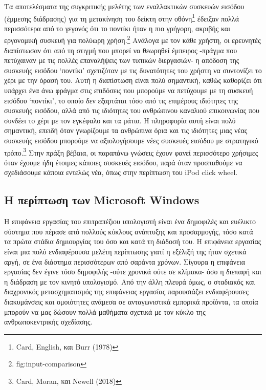 \documentclass[
]{article}
\begin{document}
Τα αποτελέσματα της συγκριτικής μελέτης των εναλλακτικών συσκευών
εισόδου (έμμεσης διάδρασης) για τη μετακίνηση του δείκτη στην
οθόνη\footnote{Card, English, και Burr (1978)} έδειξαν πολλά περισσότερα
από το γεγονός ότι το ποντίκι ήταν η πιο γρήγορη, ακριβής και εργονομική
συσκευή για πολύωρη χρήση.\footnote{fig:input-comparison} Ανάλογα με τον
κάθε χρήστη, οι ερευνητές διαπίστωσαν ότι από τη στιγμή που μπορεί να
θεωρηθεί έμπειρος -πράγμα που πετύχαιναν με τις πολλές επαναλήψεις των
τυπικών διεργασιών- η απόδοση της συσκευής εισόδου `ποντίκι' σχετιζόταν
με τις δυνατότητες του χρήστη να συντονίζει το χέρι με την όρασή του.
Αυτή η διαπίστωση είναι πολύ σημαντική, καθώς καθορίζει ότι υπάρχει ένα
άνω φράγμα στις επιδόσεις που μπορούμε να πετύχουμε με τη συσκευή
εισόδου `ποντίκι', το οποίο δεν εξαρτάται τόσο από τις επιμέρους
ιδιότητες της συσκευής εισόδου, αλλά από τις ιδιότητες του ανθρώπινου
καναλιού επικοινωνίας που συνδέει το χέρι με τον εγκέφαλο και τα μάτια.
Η πληροφορία αυτή είναι πολύ σημαντική, επειδή όταν γνωρίζουμε τα
ανθρώπινα όρια και τις ιδιότητες μιας νέας συσκευής εισόδου μπορούμε να
αξιολογήσουμε νέες συσκευές εισόδου με στρατηγικό τρόπο.\footnote{Card,
  Moran, και Newell (2018)} Στην πράξη βέβαια, οι παραπάνω γνώσεις έχουν
φανεί περισσότερο χρήσιμες όταν έχουμε ήδη έτοιμες κάποιες συσκευές
εισόδου, παρά όταν προσπαθούμε να σχεδιάσουμε κάποια εντελώς νέα, όπως
στην περίπτωση του iPod click wheel.

\hypertarget{ux3b7-ux3c0ux3b5ux3c1ux3afux3c0ux3c4ux3c9ux3c3ux3b7-ux3c4ux3c9ux3bd-microsoft-windows}{%
\subsection{Η περίπτωση των Microsoft
Windows}\label{ux3b7-ux3c0ux3b5ux3c1ux3afux3c0ux3c4ux3c9ux3c3ux3b7-ux3c4ux3c9ux3bd-microsoft-windows}}

Η επιφάνεια εργασίας του επιτραπέζιου υπολογιστή είναι ένα δημοφιλές και
ευέλικτο σύστημα που πέρασε από πολλούς κύκλους ανάπτυξης και
προσαρμογής, τόσο κατά τα πρώτα στάδια δημιουργίας του όσο και κατά τη
διάδοσή του. Η επιφάνεια εργασίας είναι μια πολύ ενδιαφέρουσα μελέτη
περίπτωσης γιατί η εξέλιξή της ήταν σχετικά αργή, σε ένα διάστημα
περισσότερων από σαράντα χρόνων. Σίγουρα η επιφάνεια εργασίας δεν έγινε
τόσο δημοφιλής -ούτε χρονικά ούτε σε κλίμακα- όσο η διεπαφή και η
διάδραση με τον κινητό υπολογισμό. Από την άλλη πλευρά όμως, ο σταδιακός
και διαχρονικός μετασχηματισμός της επιφάνειας εργασίας παρουσιάζει
ενδιαφέρουσες διακυμάνσεις και ομοιότητες ανάμεσα σε ανταγωνιστικά
εμπορικά προϊόντα, τα οποία μπορούν να μας δώσουν πολλά μαθήματα σχετικά
με τον κύκλο της ανθρωποκεντρικής σχεδίασης.
\end{document}
